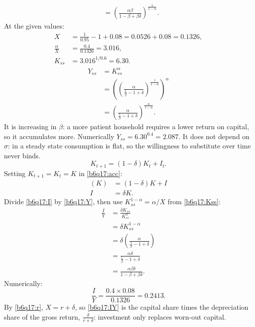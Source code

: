 \begin{sol}
\begin{align}
&=\left(\frac{\alpha\beta}{1-\beta+\beta\delta}\right)^{\frac1{1-\alpha}}.\nonumber
\end{align}
At the given values:
\begin{align*}
X&=\tfrac1{0.95}-1+0.08=0.0526+0.08=0.1326,\\
\frac{\alpha}{X}&=\frac{0.4}{0.1326}=3.016,\\
K_{ss}&=3.016^{1/0.6}=6.30.
\end{align*}
\begin{align}
Y_{ss}&=K_{ss}^\alpha \nonumber\\
&=\left(\left(\frac{\alpha}{\frac1\beta-1+\delta}\right)^{\frac1{1-\alpha}}\right)^{\alpha}\nonumber\\
&=\left(\frac{\alpha}{\frac1\beta-1+\delta}\right)^{\frac{\alpha}{1-\alpha}}. \label{b6q17:Y}
\end{align}
It is increasing in $\beta$: a more patient household requires a lower return on capital, so it accumulates more. Numerically
$Y_{ss}=6.30^{0.4}=2.087$. It does not depend on $\sigma$: in a steady state consumption is flat, so the willingness to substitute
over time never binds.
\begin{equation}
K_{t+1}=(1-\delta)K_t+I_t. \label{b6q17:acc}
\end{equation}
Setting $K_{t+1}=K_t=K$ in \eqref{b6q17:acc}:
\begin{align}
(K)&=(1-\delta)K+I\nonumber\\
I&=\delta K. \label{b6q17:I}
\end{align}
Divide \eqref{b6q17:I} by \eqref{b6q17:Y}, then use $K_{ss}^{1-\alpha}=\alpha/X$ from \eqref{b6q17:Kss}:
\begin{align}
\frac IY&=\frac{\delta K_{ss}}{K_{ss}^\alpha}\nonumber\\
&=\delta K_{ss}^{1-\alpha}\nonumber\\
&=\delta\left(\frac{\alpha}{\frac1\beta-1+\delta}\right)\nonumber\\
&=\frac{\alpha\delta}{\frac1\beta-1+\delta} \label{b6q17:IY}\\
&=\frac{\alpha\beta\delta}{1-\beta+\beta\delta}.\nonumber
\end{align}
Numerically:
\[
\frac IY=\frac{0.4\times0.08}{0.1326}=0.2413 .
\]
By \eqref{b6q17:r}, $X=r+\delta$, so \eqref{b6q17:IY} is the capital share times the depreciation share of the gross return,
$\frac{\delta}{r+\delta}$: investment only replaces worn-out capital.

\end{sol}
